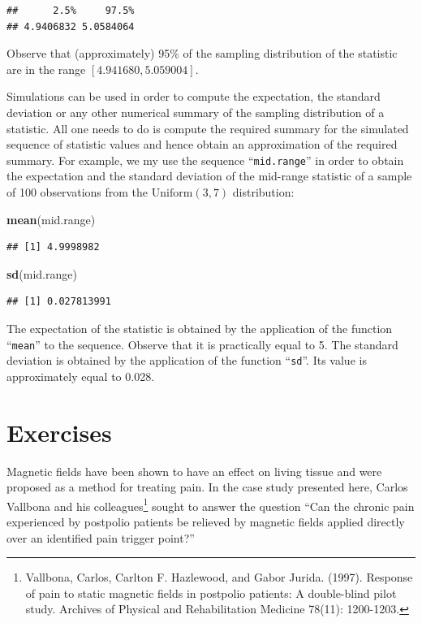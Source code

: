 \documentclass[]{krantz}
\makeatletter
\newenvironment{Shaded}{\begin{snugshade}}{\end{snugshade}}
\newcommand{\KeywordTok}[1]{\textcolor[rgb]{0.13,0.29,0.53}{\textbf{#1}}}
\newcommand{\NormalTok}[1]{#1}
\newenvironment{kframe}{%
\medskip{}
\setlength{\fboxsep}{.8em}
 \def\at@end@of@kframe{}%
 \ifinner\ifhmode%
  \def\at@end@of@kframe{\end{minipage}}%
  \begin{minipage}{\columnwidth}%
 \fi\fi%
 \def\FrameCommand##1{\hskip\@totalleftmargin \hskip-\fboxsep
 \colorbox{shadecolor}{##1}\hskip-\fboxsep
     \hskip-\linewidth \hskip-\@totalleftmargin \hskip\columnwidth}%
 \MakeFramed {\advance\hsize-\width
   \@totalleftmargin\z@ \linewidth\hsize
   \@setminipage}}%
 {\par\unskip\endMakeFramed%
 \at@end@of@kframe}
\renewenvironment{Shaded}{\begin{kframe}}{\end{kframe}}
\theoremstyle{definition}
\theoremstyle{definition}
\theoremstyle{definition}
\theoremstyle{remark}
\makeatother
\begin{document}
\begin{verbatim}
##      2.5%     97.5% 
## 4.9406832 5.0584064
\end{verbatim}

Observe that (approximately) 95\% of the sampling distribution of the
statistic are in the range \([4.941680, 5.059004]\).

Simulations can be used in order to compute the expectation, the
standard deviation or any other numerical summary of the sampling
distribution of a statistic. All one needs to do is compute the required
summary for the simulated sequence of statistic values and hence obtain
an approximation of the required summary. For example, we my use the
sequence ``\texttt{mid.range}'' in order to obtain the expectation and
the standard deviation of the mid-range statistic of a sample of 100
observations from the \(\mathrm{Uniform}(3,7)\) distribution:

\begin{Shaded}
\begin{Highlighting}[]
\KeywordTok{mean}\NormalTok{(mid.range)}
\end{Highlighting}
\end{Shaded}

\begin{verbatim}
## [1] 4.9998982
\end{verbatim}

\begin{Shaded}
\begin{Highlighting}[]
\KeywordTok{sd}\NormalTok{(mid.range)}
\end{Highlighting}
\end{Shaded}

\begin{verbatim}
## [1] 0.027813991
\end{verbatim}

The expectation of the statistic is obtained by the application of the
function ``\texttt{mean}'' to the sequence. Observe that it is
practically equal to 5. The standard deviation is obtained by the
application of the function ``\texttt{sd}''. Its value is approximately
equal to 0.028.

\section{Exercises}\label{exercises-4}

Magnetic fields have been shown to have an effect on living tissue and
were proposed as a method for treating pain. In the case study presented
here, Carlos Vallbona and his colleagues\footnote{Vallbona, Carlos,
  Carlton F. Hazlewood, and Gabor Jurida. (1997). Response of pain to
  static magnetic fields in postpolio patients: A double-blind pilot
  study. Archives of Physical and Rehabilitation Medicine 78(11):
  1200-1203.} sought to answer the question ``Can the chronic pain
experienced by postpolio patients be relieved by magnetic fields applied
directly over an identified pain trigger point?''
\end{document}
